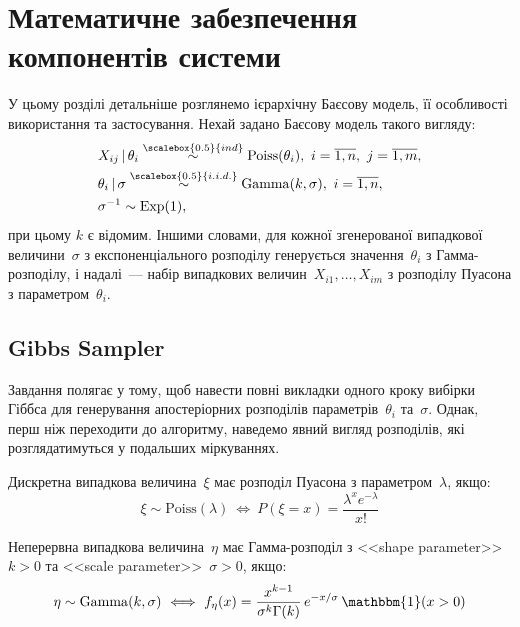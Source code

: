 \section{Математичне забезпечення компонентів системи}


У цьому розділі детальніше розглянемо ієрархічну Баєсову модель, її особливості використання та застосування. Нехай задано Баєсову модель такого вигляду:
\begin{align}
    & X_{ij} \,|\, \theta_i \overset{\scalebox{0.5}{ind}}{\sim} \mathrm{Poiss}(\theta_i),\ i=\overline{1,n},\ j=\overline{1,m}, \label{task 5 - eq: Bayes model Xij} \\
    & \theta_i \,|\, \sigma \overset{\scalebox{0.5}{i.i.d.}}{\sim} \mathrm{Gamma}(k,\sigma),\ i=\overline{1,n}, \label{task 5 - eq: Bayes model theta} \\
    & \sigma^{-1} \sim \mathrm{Exp}(1), \label{task 5 - eq: Bayes model sigma}
\end{align}
при цьому $k$ є відомим. Іншими словами, для кожної згенерованої випадкової величини~$\sigma$ з експоненціального розподілу генерується значення~$\theta_i$ з Гамма-розподілу, і надалі~--- набір випадкових величин~$X_{i1},\ldots,X_{im}$ з розподілу Пуасона з параметром~$\theta_i$.

\subsection{Gibbs Sampler}

Завдання полягає у тому, щоб навести повні викладки одного кроку вибірки Гіббса для генерування апостеріорних розподілів параметрів~$\theta_i$ та~$\sigma$. Однак, перш ніж переходити до алгоритму, наведемо явний вигляд розподілів, які розглядатимуться у подальших міркуваннях.  

Дискретна випадкова величина~$\xi$ має розподіл Пуасона з параметром~$\lambda$, якщо: 
\begin{equation}\label{task 5 - eq: dPoisson}
    \xi \sim \mathrm{Poiss}(\lambda) \ \Longleftrightarrow \ P(\xi=x) = \frac{\lambda^{x}e^{-\lambda}}{x!} 
\end{equation}

Неперервна випадкова величина~$\eta$ має Гамма-розподіл з <<shape parameter>> $k>0$ та <<scale parameter>>~$\sigma>0$, якщо:
\begin{equation}\label{task 5 - eq: dGamma}
    \eta \sim \mathrm{Gamma}(k,\sigma) \ \Longleftrightarrow \ f_{\eta}(x) = \frac{x^{k-1}}{\sigma^{k}\Gamma(k)}\, e^{-x/\sigma}\, \mathbbm{1}(x>0)
\end{equation}

